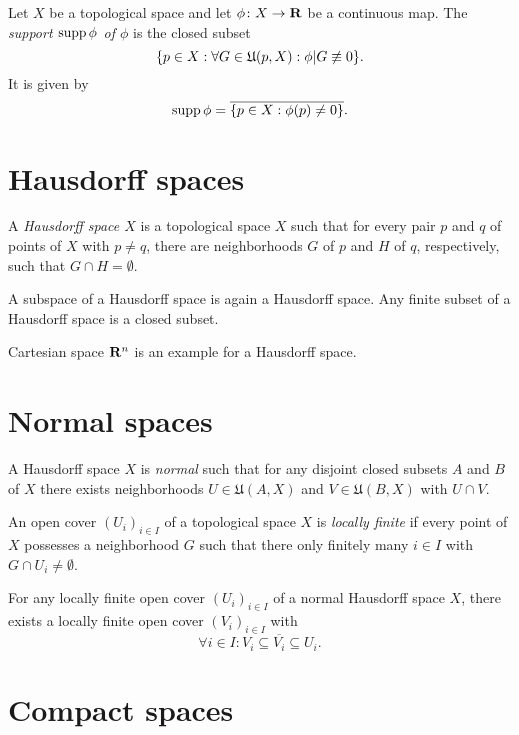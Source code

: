 Let $X$ be a topological space and let $\phi\colon X \to \mathbf{R}$ be a continuous map.
The \emph{support $\operatorname{supp} \phi$ of $\phi$} is the closed subset
\[
  \lbrace p \in X : \forall G \in \mathfrak U(p, X): \phi|G \not\equiv 0\rbrace.
\]
It is given by
\begin{equation}
  \label{eq:support}
  \operatorname{supp} \phi = \overline{\lbrace p \in X : \phi(p) \neq 0\rbrace}.
\end{equation}

\section{Hausdorff spaces}
\label{sec:hausdorff_spaces}

\begin{dfn}
  A \emph{Hausdorff space $X$} is a topological space $X$ such that for every
  pair $p$ and $q$ of points of $X$ with $p \neq q$, there are neighborhoods $G$
  of $p$ and $H$ of $q$, respectively, such that $G \cap H = \emptyset$.
\end{dfn}
A subspace of a Hausdorff space is again a Hausdorff space. Any finite subset of
a Hausdorff space is a closed subset.

Cartesian space $\mathbf{R}^n$ is an example for a Hausdorff space.

\section{Normal spaces}

\begin{dfn}
  A Hausdorff space $X$ is \emph{normal} such that for any disjoint closed
  subsets $A$ and $B$ of $X$ there exists neighborhoods $U \in \mathfrak U(A, X)$
  and $V \in \mathfrak U(B, X)$ with $U \cap V$.
\end{dfn}

An open cover $(U_i)_{i \in I}$ of a topological space $X$ is \emph{locally finite}
if every point of $X$ possesses a neighborhood $G$ such that there only finitely
many $i \in I$ with $G \cap U_i \neq \emptyset$.
\begin{thm}
  \label{prop:shrinking_lemma}
  For any locally finite open cover $(U_i)_{i \in I}$ of a normal Hausdorff space $X$, there
  exists a locally finite open cover $(V_i)_{i \in I}$ with
  \[
    \forall i \in I : V_i \subseteq \overline{V_i} \subseteq U_i.
  \]
\end{thm}

\section{Compact spaces}
\label{sec:compact}

